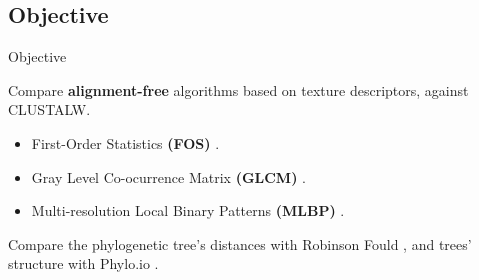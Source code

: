 \documentclass[10pt]{beamer}
\newcommand{\1}{
	\setbeamertemplate{background}{
		\texttt{[image: img/1\_dna]}
		\tikz[overlay] \fill[fill opacity=0.75,fill=white] (0,0) rectangle (-\paperwidth,\paperheight);
	}
}
\begin{document}
\subsection{Objective}

\begin{frame}{Objective}{}
	\begin{block}{}
		Compare  \textbf{alignment-free} algorithms based on texture descriptors, against CLUSTALW. 
		\begin{itemize}
			\item First-Order Statistics  \textbf{(FOS)} \cite{delibacs2020dna}.
			\item Gray Level Co-ocurrence Matrix \textbf{(GLCM)} \cite{chen2018use}.
			\item Multi-resolution Local Binary Patterns \textbf{(MLBP)} \cite{kouchaki2019signal}.
		\end{itemize}
	\end{block}

	\begin{block}{}
		Compare the phylogenetic tree's distances with Robinson Fould \cite{robinson1981comparison}, and trees' structure with Phylo.io \cite{robinson2016phylo}. 
	\end{block}
\end{frame}

\end{document}
